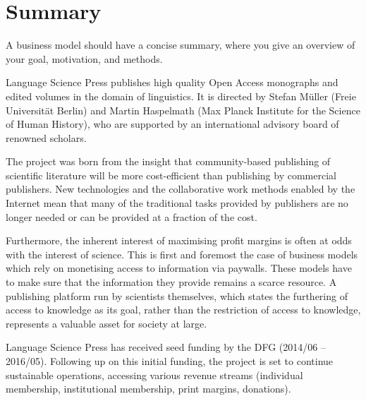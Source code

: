 \documentclass[nonflat,smallfont
]{langsci/langscibook}
\newcommand{\background}[1]{ 
  \vspace{5mm}
  \renewcommand{\tblslinecolour}{lsDarkBlue}
  \tblssy[red]{explore2}{Background}{\vspace*{-5mm}#1}
}
\newcommand{\langscisolution}[1]{
  \renewcommand{\tblslinecolour}{lsLightBlue}
  \tblssy{langsci}{LangSci solution}{\vspace*{-5mm}#1}
}
\renewcommand{\tblssy}[4][black!12]{%
  \renewcommand{\langscisymbol}{#2}\renewcommand{\tblsboxcolor}{#1}
  \begin{mdframed}[style=yellowexercise,frametitle={#3}]
    #4
  \end{mdframed}
}
\begin{document}
\chapter{Summary} 
\background{ 
A business model should have a concise summary, where you give an overview of your goal, motivation, and methods.
}
\langscisolution{ 
Language Science Press publishes high quality Open Access monographs and edited volumes in the domain of linguistics. It is directed by Stefan Müller (Freie Universität Berlin) and Martin Haspelmath (Max Planck Institute for the Science of Human History), who are supported by an international advisory board of renowned scholars.

The project was born from the insight that community-based publishing of scientific literature will be more cost-efficient than publishing by commercial publishers. New technologies and the collaborative work methods enabled by the Internet mean that many of the traditional tasks provided by publishers are no longer needed or can be provided at a fraction of the cost. 

Furthermore, the inherent interest of maximising profit margins is often at odds with the interest of science. This is first and foremost the case of business models which rely on monetising access to information via paywalls. These models have to make sure that the information they provide remains a scarce resource. A publishing platform run by scientists themselves, which states the furthering of access to knowledge as its goal, rather than the restriction of access to knowledge, represents a valuable asset for society at large. 

Language Science Press has received seed funding by the DFG (2014/06 – 2016/05). Following up on this initial funding, the project is set to continue sustainable operations, accessing various revenue streams (individual membership, institutional membership, print margins, donations). 

}
\end{document}
